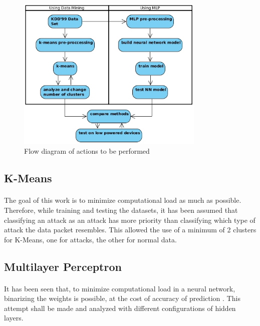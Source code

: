 \documentclass[a4paper,12pt]{article}
\begin{document}
        \begin{figure}[h!]
            \hfill\includegraphics[width=0.8\textwidth]{methodology}\hspace*{\fill}
            \caption{Flow diagram of actions to be performed}
        \end{figure}

        \subsection{K-Means}
        \paragraph{}
        The goal of this work is to minimize computational load as much as possible. Therefore, while training and testing the datasets, it has been assumed that classifying an attack as an attack has more priority than classifying which type of attack the data packet resembles. This allowed the use of a minimum of 2 clusters for K-Means, one for attacks, the other for normal data.

        \subsection{Multilayer Perceptron}
        \paragraph{}
        It has been seen that, to minimize computational load in a neural network, binarizing the weights is possible, at the cost of accuracy of prediction \cite{mlp17}. This attempt shall be made and analyzed with different configurations of hidden layers.
\end{document}
